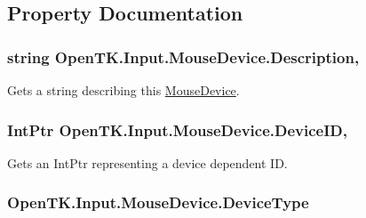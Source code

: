 \subsection{Property Documentation}
\hypertarget{class_open_t_k_1_1_input_1_1_mouse_device_a0c31489165ae480b490e8ab0aa375fab}{
\subsubsection[{Description}]{\setlength{\rightskip}{0pt plus 5cm}string Open\-T\-K.\-Input.\-Mouse\-Device.\-Description\hspace{0.3cm}{\ttfamily [get]}, {\ttfamily [set]}}}\label{class_open_t_k_1_1_input_1_1_mouse_device_a0c31489165ae480b490e8ab0aa375fab}


Gets a string describing this \hyperlink{class_open_t_k_1_1_input_1_1_mouse_device}{Mouse\-Device}. 

\hypertarget{class_open_t_k_1_1_input_1_1_mouse_device_a8ddb35f6a104a3db46481d2290d76f57}{
\subsubsection[{Device\-I\-D}]{\setlength{\rightskip}{0pt plus 5cm}Int\-Ptr Open\-T\-K.\-Input.\-Mouse\-Device.\-Device\-I\-D\hspace{0.3cm}{\ttfamily [get]}, {\ttfamily [set]}}}\label{class_open_t_k_1_1_input_1_1_mouse_device_a8ddb35f6a104a3db46481d2290d76f57}


Gets an Int\-Ptr representing a device dependent I\-D. 

\hypertarget{class_open_t_k_1_1_input_1_1_mouse_device_a4583df744630520f932eca2d821d5aa8}{
\subsubsection[{Device\-Type}]{ Open\-T\-K.\-Input.\-Mouse\-Device.\-Device\-Type\hspace{0.3cm}{\ttfamily [get]}}}\label{class_open_t_k_1_1_input_1_1_mouse_device_a4583df744630520f932eca2d821d5aa8}


